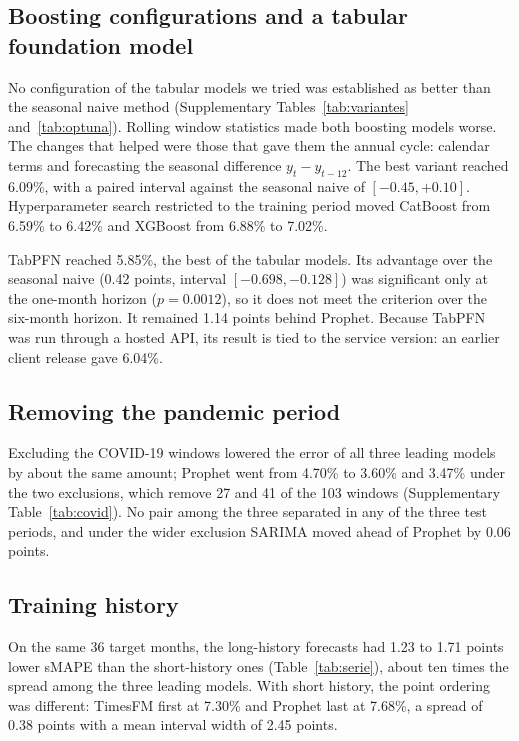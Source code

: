 \subsection{Boosting configurations and a tabular foundation model}

No configuration of the tabular models we tried was established as better than the seasonal
naive method (Supplementary Tables~\ref{tab:variantes} and~\ref{tab:optuna}). Rolling window
statistics made both boosting models worse. The changes that helped were those that gave
them the annual cycle: calendar terms and forecasting the seasonal difference
$y_t - y_{t-12}$. The best variant reached 6.09\%, with a paired interval against the
seasonal naive of $[-0.45, +0.10]$. Hyperparameter search restricted to the training period
moved CatBoost from 6.59\% to 6.42\% and XGBoost from 6.88\% to 7.02\%.

TabPFN reached 5.85\%, the best of the tabular models. Its advantage over the seasonal
naive (0.42 points, interval $[-0.698, -0.128]$) was significant only at the one-month
horizon ($p=0.0012$), so it does not meet the criterion over the six-month horizon. It
remained 1.14 points behind Prophet. Because TabPFN was run through a hosted API, its result
is tied to the service version: an earlier client release gave 6.04\%.

\subsection{Removing the pandemic period}

Excluding the COVID-19 windows lowered the error of all three leading models by about the
same amount; Prophet went from 4.70\% to 3.60\% and 3.47\% under the two exclusions, which
remove 27 and 41 of the 103 windows (Supplementary Table~\ref{tab:covid}). No pair among the
three separated in any of the three test periods, and under the wider exclusion SARIMA moved
ahead of Prophet by 0.06 points.

\subsection{Training history}



On the same 36 target months, the long-history forecasts had 1.23 to 1.71 points lower
sMAPE than the short-history ones (Table~\ref{tab:serie}), about ten times the spread among
the three leading models. With short history, the point ordering was different: TimesFM
first at 7.30\% and Prophet last at 7.68\%, a spread of 0.38 points with a mean interval
width of 2.45 points.

